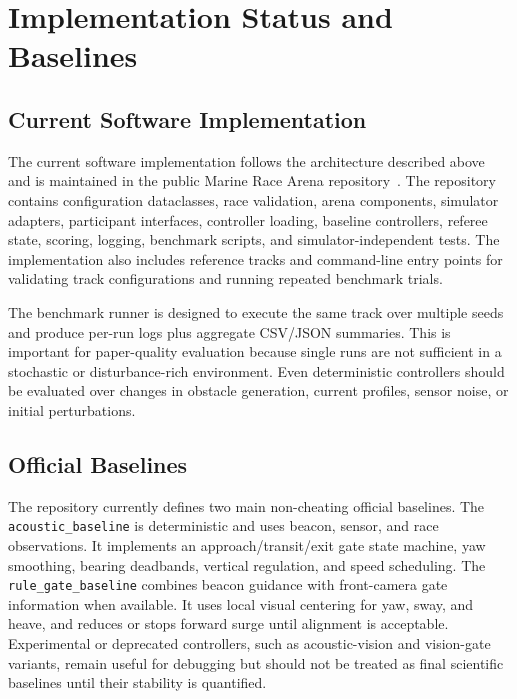 \section{Implementation Status and Baselines}

\subsection{Current Software Implementation}

The current software implementation follows the architecture described above and is maintained in the public Marine Race Arena repository~\cite{holoDroneCompetition2026}. The repository contains configuration dataclasses, race validation, arena components, simulator adapters, participant interfaces, controller loading, baseline controllers, referee state, scoring, logging, benchmark scripts, and simulator-independent tests. The implementation also includes reference tracks and command-line entry points for validating track configurations and running repeated benchmark trials.

The benchmark runner is designed to execute the same track over multiple seeds and produce per-run logs plus aggregate CSV/JSON summaries. This is important for paper-quality evaluation because single runs are not sufficient in a stochastic or disturbance-rich environment. Even deterministic controllers should be evaluated over changes in obstacle generation, current profiles, sensor noise, or initial perturbations.

\subsection{Official Baselines}

The repository currently defines two main non-cheating official baselines. The \texttt{acoustic\_baseline} is deterministic and uses beacon, sensor, and race observations. It implements an approach/transit/exit gate state machine, yaw smoothing, bearing deadbands, vertical regulation, and speed scheduling. The \texttt{rule\_gate\_baseline} combines beacon guidance with front-camera gate information when available. It uses local visual centering for yaw, sway, and heave, and reduces or stops forward surge until alignment is acceptable. Experimental or deprecated controllers, such as acoustic-vision and vision-gate variants, remain useful for debugging but should not be treated as final scientific baselines until their stability is quantified.

